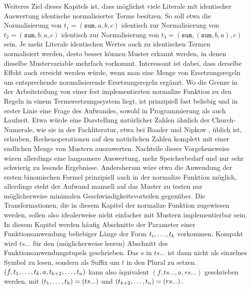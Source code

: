 Weiteres Ziel dieses Kapitels ist, dass möglichst viele Literale mit identischer Auswertung identische normalisierter Terme besitzen. So soll etwa die Normalisierung von $t_1 = (\texttt{sum}, a, b, c)$ identisch zur Normalisierung von $t_2 = (\texttt{sum}, b, a, c)$ identisch zur Normalisierung von $t_3 = (\texttt{sum}, (\texttt{sum}, b, a), c)$ sein. Je mehr Literale identischen Wertes auch zu identischen Termen normalisiert werden, desto besser können Muster erkannt werden, in denen dieselbe Mustervariable mehrfach vorkommt. Interessant ist dabei, dass derselbe Effekt auch erreicht werden würde, wenn man eine Menge von Ersetzungsregeln um entsprechende normalisierende Ersetzungsregeln ergänzt. Wo die Grenze in der Arbeitsteilung von einer fest implementierten $\mathrm{normalize}$ Funktion zu den Regeln in einem Termersetzungssystem liegt, ist prinzipiell fast beliebig und in erster Linie eine Frage des Aufwandes, sowohl in Programmierung als auch Laufzeit. Etwa würde eine Darstellung natürlicher Zahlen ähnlich der Church-Numerale, wie sie in der Fachliteratur, etwa bei Baader und Nipkow \cite{baader_nipkow_1998}, üblich ist, erlauben, Rechenoperationen auf den natürlichen Zahlen komplett mit einer endlichen Menge von Mustern auszuwerten. Nachteile dieser Vorgehensweise wären allerdings eine langsamere Auswertung, mehr Speicherbedarf und nur sehr schwierig zu lesende Ergebnisse. Andersherum wäre etwa die Anwendung der ersten binomischen Formel prinzipiell auch in der $\mathrm{normalize}$ Funktion möglich, allerdings steht der Aufwand manuell  auf das Muster zu testen nur möglicherweise minimalen Geschwindigkeitsvorteilen gegenüber. Die Transformationen, die in diesem Kapitel der $\mathrm{normalize}$ Funktion zugewiesen werden, sollen also idealerweise nicht einfacher mit Mustern implementierbar sein.\\

In diesem Kapitel werden häufig Abschnitte der Parameter einer Funktionsanwendung beliebiger Länge der Form ${t}_{i}, \dots, {t}_{k}$ vorkommen. Kompakt wird $ts...$ für den (möglicher\-weise leeren) Abschnitt des Funktionsanwendungstupels geschrieben. Das $s$ in $ts...$ ist dann nicht als einzelnes Symbol zu lesen, sondern als Suffix um $t$ in den Plural zu setzen. \\$(f, {t}_{1}, \dots, {t}_{k}, a, {t}_{k+2}, \dots, {t}_{n})$ kann also äquivalent $(f, ts..., a, rs...)$ geschrieben werden, mit $({t}_{1}, \dots, {t}_{k}) = (ts...)$ und $({t}_{k+2}, \dots, {t}_{n}) = (rs...)$.\\

